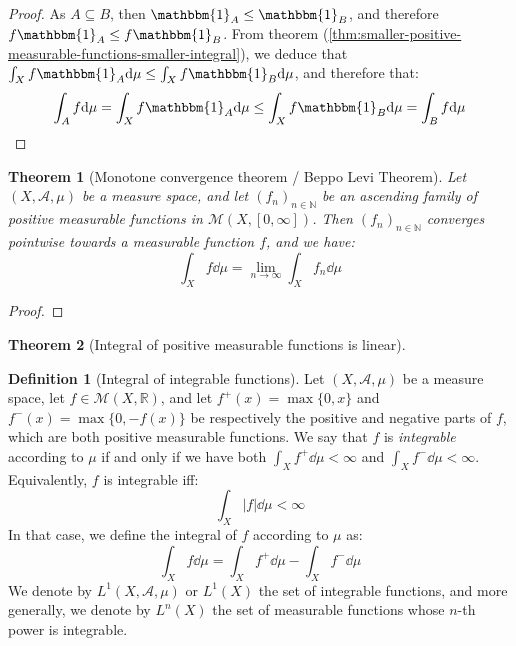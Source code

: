 \documentclass{article}
\newtheorem{theorem}{Theorem}[section]
\theoremstyle{definition}
\newtheorem{definition}{Definition}[section]
\theoremstyle{remark}
\theoremstyle{example}
\theoremstyle{notation}
\theoremstyle{axiom}
\begin{document}
\begin{proof}
		As $A \subseteq B$, then $\mathbbm{1}_A \leq \mathbbm{1}_B$, and therefore $f \mathbbm{1}_A \leq f \mathbbm{1}_B$. From theorem (\ref{thm:smaller-positive-measurable-functions-smaller-integral}), we deduce that $\int_X f \mathbbm{1}_A \dd \mu \leq \int_X f \mathbbm{1}_B \dd \mu$, and therefore that:
				$$\int_A f \dd \mu = \int_X f \mathbbm{1}_A \dd \mu \leq \int_X f \mathbbm{1}_B \dd \mu = \int_B f \dd \mu$$
\end{proof}

\begin{theorem}[Monotone convergence theorem / Beppo Levi Theorem] %
		Let $(X, \mathcal{A}, \mu)$ be a measure space, and let $(f_n)_{n \in \mathbb{N}}$ be an ascending family of positive measurable functions in $\mathcal{M}(X, [0, \infty])$. Then $(f_n)_{n \in \mathbb{N}}$ converges pointwise towards a measurable function $f$, and we have:
				$$\int_X f \dd \mu = \lim_{n \rightarrow \infty} \int_X f_n \dd \mu$$
\end{theorem}

\begin{proof}
\end{proof}

\begin{theorem}[Integral of positive measurable functions is linear] \label{thm:integral-positive-measurable-functions-linear} %
\end{theorem}


\begin{definition}[Integral of integrable functions] %
		Let $(X, \mathcal{A}, \mu)$ be a measure space, let $f \in \mathcal{M}(X, \mathbb{R})$, and let $f^+(x) = \max \{0, x\}$ and $f^-(x) = \max \{0, -f(x)\}$ be respectively the positive and negative parts of $f$, which are both positive measurable functions. We say that $f$ is \textit{integrable} according to $\mu$ if and only if we have both $\int_X f^+ \dd \mu < \infty$ and $\int_X f^- \dd \mu < \infty$. Equivalently, $f$ is integrable iff:
				$$\int_X |f| \dd \mu < \infty$$
		In that case, we define the integral of $f$ according to $\mu$ as:
				$$\int_X f \dd \mu = \int_X f^+ \dd \mu - \int_X f^- \dd \mu$$
		We denote by $L^1(X, \mathcal{A}, \mu)$ or $L^1(X)$ the set of integrable functions, and more generally, we denote by $L^n(X)$ the set of measurable functions whose $n$-th power is integrable.
\end{definition}
\end{document}
